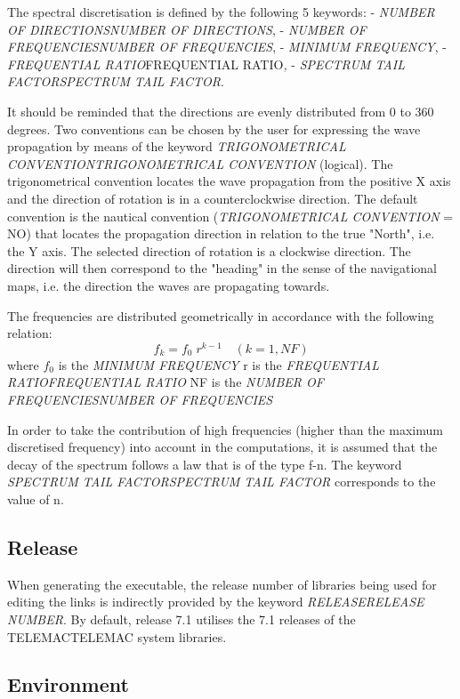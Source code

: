  The spectral discretisation is defined by the following 5 keywords:  - \textit{NUMBER OF DIRECTIONSNUMBER OF DIRECTIONS},   - \textit{NUMBER OF FREQUENCIESNUMBER OF FREQUENCIES},   - \textit{MINIMUM FREQUENCY},   - \textit{FREQUENTIAL RATIO}FREQUENTIAL RATIO\textit{,}  - \textit{SPECTRUM TAIL FACTORSPECTRUM TAIL FACTOR}.

 It should be reminded that the directions are evenly distributed from 0 to 360 degrees. Two conventions can be chosen by the user for expressing the wave propagation by means of the keyword \textit{TRIGONOMETRICAL CONVENTIONTRIGONOMETRICAL CONVENTION }(logical). The trigonometrical convention locates the wave propagation from the positive X axis and the direction of rotation is in a counterclockwise direction. The default convention is the nautical convention (\textit{TRIGONOMETRICAL CONVENTION} = NO) that locates the propagation direction in relation to the true "North", i.e. the Y axis. The selected direction of rotation is a clockwise direction. The direction will then correspond to the "heading" in the sense of the navigational maps, i.e. the direction the waves are propagating towards.

 The frequencies are distributed geometrically in accordance with the following relation:
\[f_{k} =f_{0} \; r^{k-1} \quad (k=1,NF)\]
where $f_{0} $ is the \textit{MINIMUM FREQUENCY }  r is the \textit{FREQUENTIAL RATIOFREQUENTIAL RATIO}   NF is the \textit{NUMBER OF FREQUENCIESNUMBER OF FREQUENCIES}

 In order to take the contribution of high frequencies (higher than the maximum discretised frequency) into account in the computations, it is assumed that the decay of the spectrum follows a law that is of the type f-n. The keyword \textit{SPECTRUM TAIL FACTORSPECTRUM TAIL FACTOR }corresponds to the value of n.


\subsection{ Release}

 When generating the executable, the release number of libraries being used for editing the links is indirectly provided by the keyword \textit{\tomawac RELEASERELEASE NUMBER}. By default, \tomawac release 7.1 utilises the 7.1 releases of the TELEMACTELEMAC system libraries.


\subsection{ Environment}

